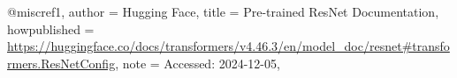 @misc{ref1,
	author    = {Hugging Face},
	title     = {Pre-trained ResNet Documentation},
	howpublished = {\url{https://huggingface.co/docs/transformers/v4.46.3/en/model_doc/resnet#transformers.ResNetConfig}},
	note      = {Accessed: 2024-12-05},
}